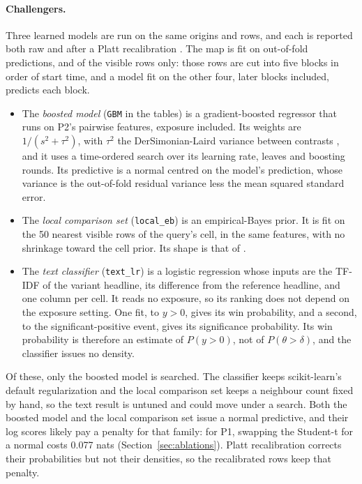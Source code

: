 \documentclass[sigconf,nonacm]{acmart}
\begin{document}
\paragraph{Challengers.} Three learned models are run on the same origins and rows, and each is reported both raw and after a Platt recalibration \cite{platt2000probabilities}. The map is fit on out-of-fold predictions, and of the visible rows only: those rows are cut into five blocks in order of start time, and a model fit on the other four, later blocks included, predicts each block.
\begin{itemize}
\item The \emph{boosted model} (\texttt{GBM} in the tables) is a gradient-boosted regressor that runs on P2's pairwise features, exposure included. Its weights are $1/(s^2 + \tau^2)$, with $\tau^2$ the DerSimonian-Laird variance between contrasts \cite{dersimonian1986meta}, and it uses a time-ordered search over its learning rate, leaves and boosting rounds. Its predictive is a normal centred on the model's prediction, whose variance is the out-of-fold residual variance less the mean squared standard error.
\item The \emph{local comparison set} (\texttt{local\_eb}) is an empirical-Bayes prior. It is fit on the 50 nearest visible rows of the query's cell, in the same features, with no shrinkage toward the cell prior. Its shape is that of \cite{li2025learning}.
\item The \emph{text classifier} (\texttt{text\_lr}) is a logistic regression whose inputs are the TF-IDF of the variant headline, its difference from the reference headline, and one column per cell. It reads no exposure, so its ranking does not depend on the exposure setting. One fit, to $y > 0$, gives its win probability, and a second, to the significant-positive event, gives its significance probability. Its win probability is therefore an estimate of $P(y > 0)$, not of $P(\theta > \delta)$, and the classifier issues no density.
\end{itemize}
Of these, only the boosted model is searched. The classifier keeps scikit-learn's default regularization and the local comparison set keeps a neighbour count fixed by hand, so the text result is untuned and could move under a search. Both the boosted model and the local comparison set issue a normal predictive, and their log scores likely pay a penalty for that family: for P1, swapping the Student-t for a normal costs 0.077 nats (Section~\ref{sec:ablations}). Platt recalibration corrects their probabilities but not their densities, so the recalibrated rows keep that penalty.
\end{document}
